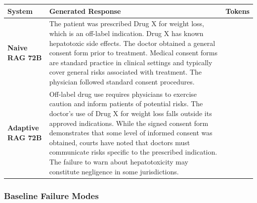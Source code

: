 \documentclass[a4paper,fleql]{cas-sc}
\begin{document}
\vspace{6pt plus 4pt minus 3pt}

\newpage 

\begin{center}
\begingroup
{}
\label{tab:casestudy_72b}
\renewcommand{\arraystretch}{1.4}
\footnotesize
\begin{tabular}{m{2.9cm} | m{9.6cm} | >{\centering\arraybackslash}m{1.5cm}}
\toprule
\textbf{System} & \textbf{Generated Response} & \textbf{Tokens} \\
\midrule
\textbf{Naive RAG 72B}
& The patient was prescribed Drug X for weight loss, which is an off-label
indication. Drug X has known hepatotoxic side effects. The doctor obtained a
general consent form prior to treatment. Medical consent forms are standard
practice in clinical settings and typically cover general risks associated
with treatment. The physician followed standard consent procedures. & 71 \\
\midrule
\textbf{Adaptive RAG 72B}
& Off-label drug use requires physicians to exercise caution and inform
patients of potential risks. The doctor's use of Drug X for weight loss falls
outside its approved indications. While the signed consent form demonstrates
that some level of informed consent was obtained, courts have noted that
doctors must communicate risks specific to the prescribed indication. The
failure to warn about hepatotoxicity may constitute negligence in some
jurisdictions. & 88 \\
\bottomrule
\end{tabular}
\endgroup
\end{center}
\vspace{6pt plus 4pt minus 3pt}
\subsubsection{Baseline Failure Modes}
\label{sssec:baseline-failures}
\end{document}

